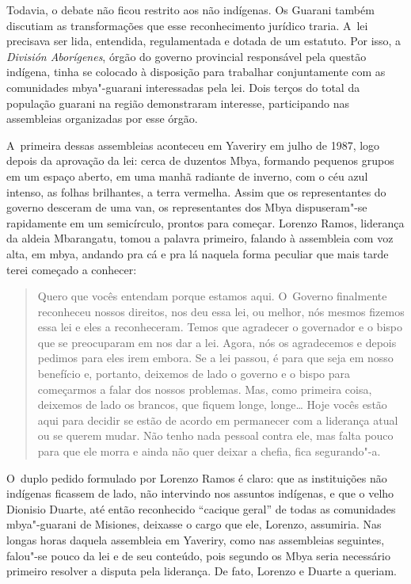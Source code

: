 Todavia, o debate não ficou restrito aos não indígenas. Os Guarani
também discutiam as transformações que esse reconhecimento jurídico
traria. A~lei precisava ser lida, entendida, regulamentada e dotada de
um estatuto. Por isso, a \emph{División Aborígenes}, órgão do governo
provincial responsável pela questão indígena, tinha se colocado à
disposição para trabalhar conjuntamente com as comunidades mbya"-guarani
interessadas pela lei. Dois terços do total da população guarani na
região demonstraram interesse, participando nas assembleias organizadas
por esse órgão. 

A~primeira dessas assembleias aconteceu em Yaveriry em julho de 1987,
logo depois da aprovação da lei: cerca de duzentos Mbya, formando
pequenos grupos em um espaço aberto, em uma manhã radiante de inverno,
com o céu azul intenso, as folhas brilhantes, a terra vermelha. Assim
que os representantes do governo desceram de uma van, os representantes
dos Mbya dispuseram"-se rapidamente em um semicírculo, prontos para
começar. Lorenzo Ramos, liderança da aldeia Mbarangatu, tomou a palavra
primeiro, falando à assembleia com voz alta, em mbya, andando pra cá e
pra lá naquela forma peculiar que mais tarde terei começado a conhecer:

\begin{quote}
Quero que vocês entendam porque estamos aqui. O~Governo finalmente
reconheceu nossos direitos, nos deu essa lei, ou melhor, nós mesmos
fizemos essa lei e eles a reconheceram. Temos que agradecer o
governador e o bispo que se preocuparam em nos dar a lei. Agora, nós os
agradecemos e depois pedimos para eles irem embora. Se a lei passou, é
para que seja em nosso benefício e, portanto, deixemos de lado o
governo e o bispo para começarmos a falar dos nossos problemas. Mas,
como primeira coisa, deixemos de lado os brancos, que fiquem longe,
longe\ldots{} Hoje vocês estão aqui para decidir se estão de acordo em
permanecer com a liderança atual ou se querem mudar. Não tenho nada
pessoal contra ele, mas falta pouco para que ele morra e ainda não quer
deixar a chefia, fica segurando"-a.
\end{quote}

O~duplo pedido formulado por Lorenzo Ramos é claro: que as instituições
não indígenas ficassem de lado, não intervindo nos assuntos indígenas,
e que o velho Dionisio Duarte, até então reconhecido ``cacique geral'' de
todas as comunidades mbya"-guarani de Misiones, deixasse o cargo que
ele, Lorenzo, assumiria. Nas longas horas daquela assembleia em
Yaveriry, como nas assembleias seguintes, falou"-se pouco da lei e de
seu conteúdo, pois segundo os Mbya seria necessário primeiro resolver a
disputa pela liderança. De fato, Lorenzo e Duarte a queriam.


